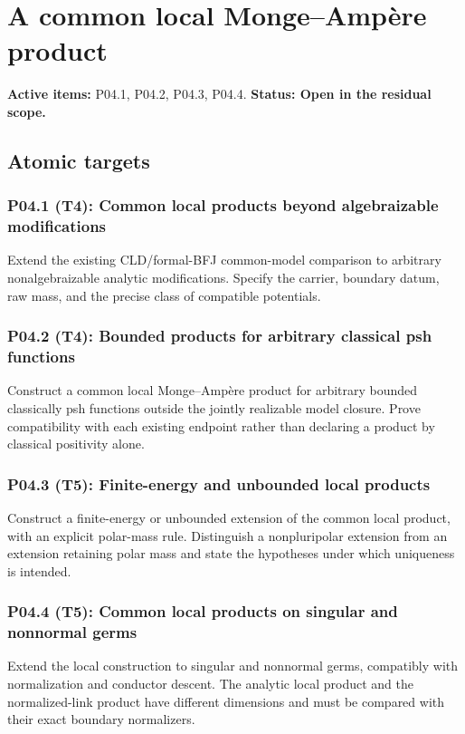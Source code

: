\documentclass[11pt,a4paper]{article}
\theoremstyle{definition}
\theoremstyle{remark}
\begin{document}
\clearpage\section{A common local Monge--Ampère product}
\label{family:3}
\noindent\textbf{Active items:} P04.1, P04.2, P04.3, P04.4. \textbf{Status: Open in the residual scope.}

\subsection{Atomic targets}
\subsubsection*{P04.1 (T4): Common local products beyond algebraizable modifications}
\label{atom:P04.1}
Extend the existing CLD/formal-BFJ common-model comparison to arbitrary nonalgebraizable analytic modifications. Specify the carrier, boundary datum, raw mass, and the precise class of compatible potentials.

\subsubsection*{P04.2 (T4): Bounded products for arbitrary classical psh functions}
\label{atom:P04.2}
Construct a common local Monge--Ampère product for arbitrary bounded classically psh functions outside the jointly realizable model closure. Prove compatibility with each existing endpoint rather than declaring a product by classical positivity alone.

\subsubsection*{P04.3 (T5): Finite-energy and unbounded local products}
\label{atom:P04.3}
Construct a finite-energy or unbounded extension of the common local product, with an explicit polar-mass rule. Distinguish a nonpluripolar extension from an extension retaining polar mass and state the hypotheses under which uniqueness is intended.

\subsubsection*{P04.4 (T5): Common local products on singular and nonnormal germs}
\label{atom:P04.4}
Extend the local construction to singular and nonnormal germs, compatibly with normalization and conductor descent. The analytic local product and the normalized-link product have different dimensions and must be compared with their exact boundary normalizers.
\end{document}
